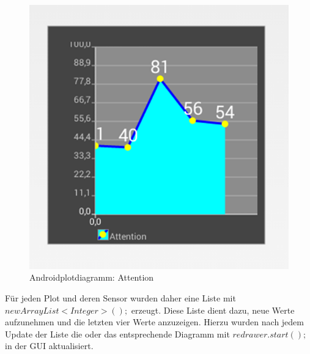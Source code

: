 \begin{figure}[hbtp]
\centering
\includegraphics[scale=0.7]{img/androidplot.png}
\caption{Androidplotdiagramm: Attention}
\label{androidplot}
\end{figure}


Für jeden Plot und deren Sensor wurden daher eine Liste mit\\ $new ArrayList<Integer>();$ erzeugt. Diese Liste dient dazu, neue Werte aufzunehmen und die letzten vier Werte anzuzeigen. 
Hierzu wurden nach jedem Update der Liste die oder das entsprechende Diagramm mit $redrawer.start();$ in der GUI aktualisiert.